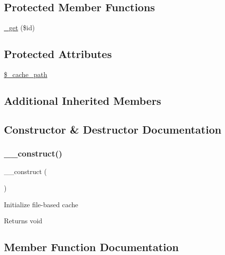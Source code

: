 \subsection*{Protected Member Functions}
\begin{DoxyCompactItemize}
\item 
\mbox{\hyperlink{class_c_i___cache__file_aae09ed79c1d2dc8b2093602181ddf911}{\+\_\+get}} (\$id)
\end{DoxyCompactItemize}
\subsection*{Protected Attributes}
\begin{DoxyCompactItemize}
\item 
\mbox{\hyperlink{class_c_i___cache__file_ae9407d6ae1ddd132cca3c7f855f89dfe}{\$\+\_\+cache\+\_\+path}}
\end{DoxyCompactItemize}
\subsection*{Additional Inherited Members}


\subsection{Constructor \& Destructor Documentation}
\mbox{\label{class_c_i___cache__file_a095c5d389db211932136b53f25f39685}} 
\subsubsection{\texorpdfstring{\+\_\+\+\_\+construct()}{\_\_construct()}}
{\footnotesize\ttfamily \+\_\+\+\_\+construct (\begin{DoxyParamCaption}{ }\end{DoxyParamCaption})}

Initialize file-\/based cache

\begin{DoxyReturn}{Returns}
void 
\end{DoxyReturn}


\subsection{Member Function Documentation}
\mbox{\label{class_c_i___cache__file_aae09ed79c1d2dc8b2093602181ddf911}} 
